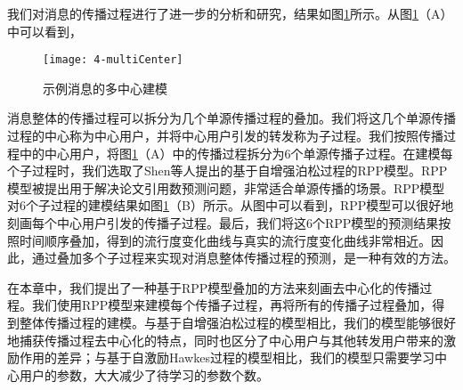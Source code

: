 我们对消息的传播过程进行了进一步的分析和研究，结果如图\ref{fig:multiCenter}所示。从图\ref{fig:multiCenter}（A）中可以看到，
\begin{figure}[!htbp]
  \centering
  \texttt{[image: 4-multiCenter]}
  \caption{示例消息的多中心建模}
  \label{fig:multiCenter}
\end{figure}
消息整体的传播过程可以拆分为几个单源传播过程的叠加。我们将这几个单源传播过程的中心称为中心用户，并将中心用户引发的转发称为子过程。我们按照传播过程中的中心用户，将图\ref{fig:multiCenter}（A）中的传播过程拆分为6个单源传播子过程。在建模每个子过程时，我们选取了Shen等人提出的基于自增强泊松过程的RPP模型。RPP模型被提出用于解决论文引用数预测问题，非常适合单源传播的场景。RPP模型对6个子过程的建模结果如图\ref{fig:multiCenter}（B）所示。从图中可以看到，RPP模型可以很好地刻画每个中心用户引发的传播子过程。最后，我们将这6个RPP模型的预测结果按照时间顺序叠加，得到的流行度变化曲线与真实的流行度变化曲线非常相近。因此，通过叠加多个子过程来实现对消息整体传播过程的预测，是一种有效的方法。

在本章中，我们提出了一种基于RPP模型叠加的方法来刻画去中心化的传播过程。我们使用RPP模型来建模每个传播子过程，再将所有的传播子过程叠加，得到整体传播过程的建模。与基于自增强泊松过程的模型相比，我们的模型能够很好地捕获传播过程去中心化的特点，同时也区分了中心用户与其他转发用户带来的激励作用的差异；与基于自激励Hawkes过程的模型相比，我们的模型只需要学习中心用户的参数，大大减少了待学习的参数个数。

